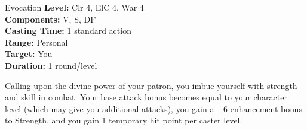 {Evocation}
{
	\textbf{Level:}
	Clr 4, ElC 4, War 4\\
	\textbf{Components:}
	V, S, DF\\
	\textbf{Casting Time:}
	1 standard action\\
	\textbf{Range:}
	Personal\\
	\textbf{Target:}
	You\\
	\textbf{Duration:}
	1 round/level\\
}
{
	Calling upon the divine power of your patron, you imbue yourself with strength and skill in combat. Your base attack bonus becomes equal to your character level (which may give you additional attacks), you gain a +6 enhancement bonus to Strength, and you gain 1 temporary hit point per caster level.

}
